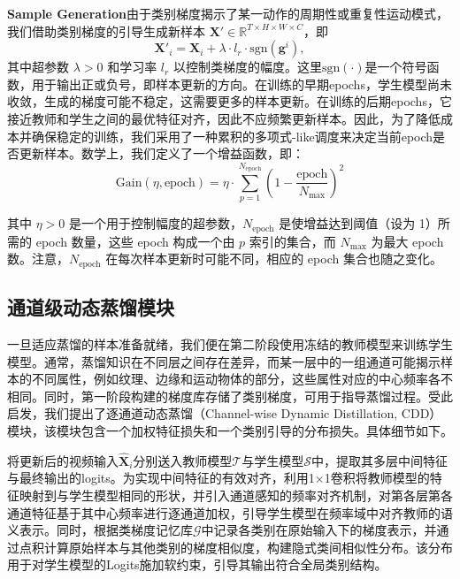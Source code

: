 \documentclass[10.5pt,letterpaper]{article}
\begin{document}
\textbf{Sample Generation}由于类别梯度揭示了某一动作的周期性或重复性运动模式，我们借助类别梯度的引导生成新样本 \(\textbf{X}' \in \mathbb{R}^{T \times H \times W \times C}\)，即
\begin{equation}
\textbf{X}'_i = \textbf{X}_i + \lambda \cdot l_r \cdot \mathrm{sgn}(\textbf{g}^i),
\label{eq:update}
\end{equation}
其中超参数 \(\lambda > 0\) 和学习率 \(l_r\) 以控制类梯度的幅度。这里\(\text{sgn}(\cdot)\)是一个符号函数，用于输出正或负号，即样本更新的方向。在训练的早期epochs，学生模型尚未收敛，生成的梯度可能不稳定，这需要更多的样本更新。在训练的后期epochs，它接近教师和学生之间的最优特征对齐，因此不应频繁更新样本。因此，为了降低成本并确保稳定的训练，我们采用了一种累积的多项式-like调度来决定当前epoch是否更新样本。数学上，我们定义了一个增益函数，即：
\begin{equation}
\text{Gain}(\eta, \text{epoch}) = \eta \cdot \sum_{p=1}^{N_{\text{epoch}}} \left(1 - \frac{\text{epoch}}{N_{\max}}\right)^2
\label{eq:gain}
\end{equation}

其中 \(\eta > 0\) 是一个用于控制幅度的超参数，\(N_{\text{epoch}}\) 是使增益达到阈值（设为 1）所需的 epoch 数量，这些 epoch 构成一个由 \(p\) 索引的集合，而 \(N_{\text{max}}\) 为最大 epoch 数。注意，\(N_{\text{epoch}}\) 在每次样本更新时可能不同，相应的 epoch 集合也随之变化。


\subsection{通道级动态蒸馏模块} 
一旦适应蒸馏的样本准备就绪，我们便在第二阶段使用冻结的教师模型来训练学生模型。通常，蒸馏知识在不同层之间存在差异，而某一层中的一组通道可能揭示样本的不同属性，例如纹理、边缘和运动物体的部分，这些属性对应的中心频率各不相同。同时，第一阶段构建的梯度库存储了类别梯度，可用于指导蒸馏过程。受此启发，我们提出了逐通道动态蒸馏（Channel-wise Dynamic Distillation, CDD）模块，该模块包含一个加权特征损失和一个类别引导的分布损失。具体细节如下。


将更新后的视频输入$\hat{\textbf{X}}_i $分别送入教师模型$\mathcal{T}$与学生模型$\mathcal{S}$中，提取其多层中间特征与最终输出的logits。为实现中间特征的有效对齐，利用1$\times$1卷积将教师模型的特征映射到与学生模型相同的形状，并引入通道感知的频率对齐机制，对第各层第各通道特征基于其中心频率进行逐通道加权，引导学生模型在频率域中对齐教师的语义表示。同时，根据类梯度记忆库$\mathcal{G}$中记录各类别在原始输入下的梯度表示，并通过点积计算原始样本与其他类别的梯度相似度，构建隐式类间相似性分布。该分布用于对学生模型的Logits施加软约束，引导其输出符合全局类别结构。
\end{document}
